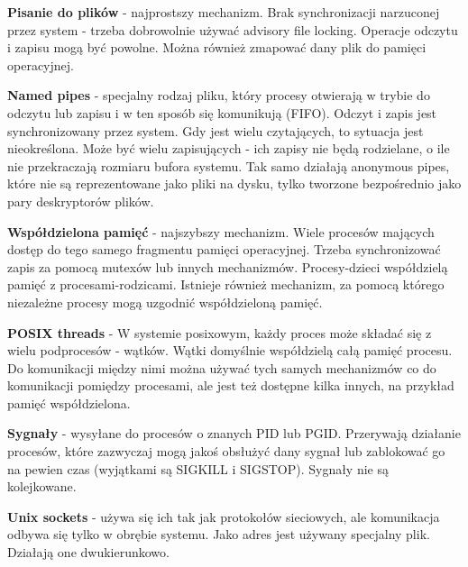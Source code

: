 \textbf{Pisanie do plików} - najprostszy mechanizm. Brak synchronizacji narzuconej przez system - trzeba dobrowolnie używać advisory file locking. Operacje odczytu i zapisu mogą być powolne. Można również zmapować dany plik do pamięci operacyjnej.

\textbf{Named pipes} - specjalny rodzaj pliku, który procesy otwierają w trybie do odczytu lub zapisu i w ten sposób się komunikują (FIFO). Odczyt i zapis jest synchronizowany przez system. Gdy jest wielu czytających, to sytuacja jest nieokreślona. Może być wielu zapisujących - ich zapisy nie będą rodzielane, o ile nie przekraczają rozmiaru bufora systemu. Tak samo działają anonymous pipes, które nie są reprezentowane jako pliki na dysku, tylko tworzone bezpośrednio jako pary deskryptorów plików.

\textbf{Współdzielona pamięć} - najszybszy mechanizm. Wiele procesów mających dostęp do tego samego fragmentu pamięci operacyjnej. Trzeba synchronizować zapis za pomocą mutexów lub innych mechanizmów. Procesy-dzieci współdzielą pamięć z procesami-rodzicami. Istnieje również mechanizm, za pomocą którego niezależne procesy mogą uzgodnić współdzieloną pamięć.

\textbf{POSIX threads} - W systemie posixowym, każdy proces może składać się z wielu podprocesów - wątków. Wątki domyślnie współdzielą całą pamięć procesu. Do komunikacji między nimi można używać tych samych mechanizmów co do komunikacji pomiędzy procesami, ale jest też dostępne kilka innych, na przykład pamięć współdzielona.

\textbf{Sygnały} - wysyłane do procesów o znanych PID lub PGID. Przerywają działanie procesów, które zazwyczaj mogą jakoś obsłużyć dany sygnał lub zablokować go na pewien czas (wyjątkami są SIGKILL i SIGSTOP). Sygnały nie są kolejkowane.

\textbf{Unix sockets} - używa się ich tak jak protokołów sieciowych, ale komunikacja odbywa się tylko w obrębie systemu. Jako adres jest używany specjalny plik. Działają one dwukierunkowo.
